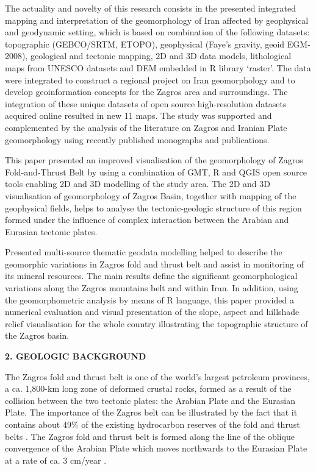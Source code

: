 \documentclass[12pt,a4paper,oneside]{article}
\def \newsection{\vspace{12pt}\textbf}
\def \newpar{\vspace{6pt}}
\begin{document}
\newpar The actuality and novelty of this research consists in the presented integrated mapping and interpretation of the geomorphology of Iran affected by geophysical and geodynamic setting, which is based on combination of the following datasets: topographic (GEBCO/SRTM, ETOPO), geophysical (Faye's gravity, geoid EGM-2008), geological and tectonic mapping, 2D and 3D data models, lithological maps from UNESCO datasets and DEM embedded in R library ‘raster’. The data were integrated to construct a regional project on Iran geomorphology and to develop geoinformation concepts for the Zagros area and surroundings. The integration of these unique datasets of open source high-resolution datasets acquired online resulted in new 11 maps. The study was supported and complemented by the analysis of the literature on Zagros and Iranian Plate geomorphology using recently published monographs and publications.

\newpar This paper presented an improved visualisation of the geomorphology of Zagros Fold-and-Thrust Belt by using a combination of GMT, R and QGIS open source tools enabling 2D and 3D modelling of the study area. The 2D and 3D visualisation of geomorphology of Zagros Basin, together with mapping of the geophysical fields, helps to analyse the tectonic-geologic structure of this region formed under the influence of complex interaction between the Arabian and Eurasian tectonic plates.

\newpar Presented multi-source thematic geodata modelling helped to describe the geomorphic variations in Zagros fold and thrust belt and assist in monitoring of its mineral resources. The main results define the significant geomorphological variations along the Zagros mountains belt and within Iran. In addition, using the geomorphometric analysis by means of R language, this paper provided a numerical evaluation and visual presentation of the slope, aspect and hillshade relief visualisation for the whole country illustrating the topographic structure of the Zagros basin.

\newsection {2. GEOLOGIC BACKGROUND}

\newpar The Zagros fold and thrust belt is one of the world's largest petroleum provinces, a ca. 1,800-km long zone of deformed crustal rocks, formed as a result of the collision between the two tectonic plates: the Arabian Plate and the Eurasian Plate. The importance of the Zagros belt can be illustrated by the fact that it contains about 49\% of the existing hydrocarbon reserves of the fold and thrust belts \citep{Cooper}. The Zagros fold and thrust belt is formed along the line of the oblique convergence of the Arabian Plate which moves northwards to the Eurasian Plate at a rate of ca. 3 cm/year \citep{Talebian}. 
\end{document}
